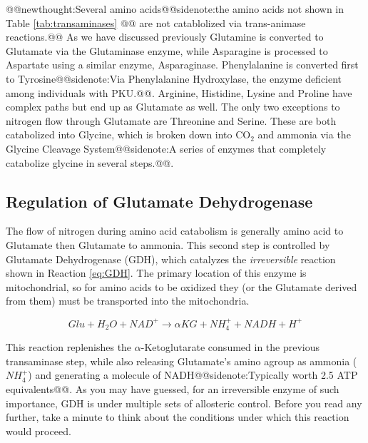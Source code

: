 \documentclass{tufte-handout}
\makeatletter
\def\newthought#1{@@newthought:#1@@}
\def\sidenote#1{@@sidenote:#1@@}
\makeatother
\begin{document}
\newthought{Several amino acids\sidenote{the amino acids not shown in Table \ref{tab:transaminases} } are not catablolized via trans-animase reactions.}  As we have discussed previously Glutamine is converted to Glutamate via the Glutaminase enzyme, while Asparagine is processed to Aspartate using a similar enzyme, Asparaginase.  Phenylalanine is converted first to Tyrosine\sidenote{Via Phenylalanine Hydroxylase\index{Enzymes!Phenylalanine Hydroxylase}, the enzyme deficient among individuals with PKU.}.  Arginine, Histidine, Lysine and Proline have complex paths but end up as Glutamate as well.  The only two exceptions to nitrogen flow through Glutamate are Threonine and Serine.  These are both catabolized into Glycine, which is broken down into CO$_2$ and ammonia via the Glycine Cleavage System\sidenote{A series of enzymes that completely catabolize glycine in several steps.}.

\subsection{Regulation of Glutamate Dehydrogenase}

The flow of nitrogen during amino acid catabolism is generally amino acid to Glutamate then Glutamate to ammonia.  This second step is controlled by Glutamate Dehydrogenase (GDH), which catalyzes the \emph{irreversible} reaction shown in Reaction \ref{eq:GDH}.  The primary location of this enzyme is mitochondrial, so for amino acids to be oxidized they (or the Glutamate derived from them) must be transported into the mitochondria.

\begin{equation}\label{eq:GDH}
Glu + H_2O + NAD^+  \rightarrow  \alpha KG + NH_4^+ + NADH + H^+
\end{equation}

This reaction replenishes the $\alpha$-Ketoglutarate consumed in the previous transaminase step, while also releasing Glutamate's amino agroup as ammonia ($NH_4^+$) and generating a molecule of NADH\sidenote{Typically worth 2.5 ATP equivalents}.  As you may have guessed, for an irreversible enzyme of such importance, GDH is under multiple sets of allosteric control.  Before you read any further, take a minute to think about the conditions under which this reaction would proceed.
\end{document}
